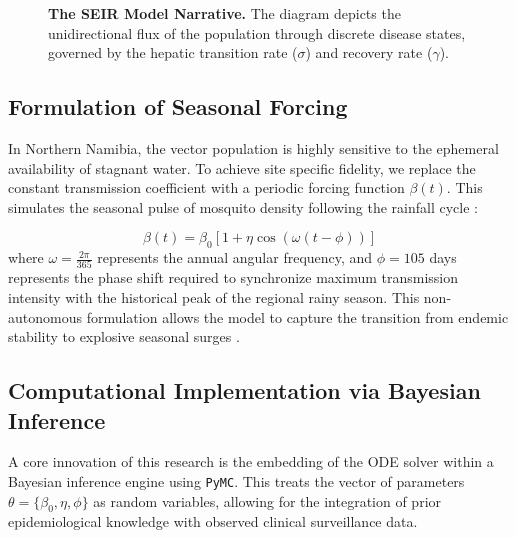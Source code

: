 \documentclass[12pt,a4paper]{report} %
\begin{document}
\begin{figure}[H]
\centering{}
\caption*{\textbf{The SEIR Model Narrative.} The diagram depicts the unidirectional flux of the population through discrete disease states, governed by the hepatic transition rate ($\sigma$) and recovery rate ($\gamma$).}
\end{figure}

\subsection{Formulation of Seasonal Forcing}
In Northern Namibia, the vector population is highly sensitive to the ephemeral availability of stagnant water. To achieve site specific fidelity, we replace the constant transmission coefficient with a periodic forcing function $\beta(t)$. This simulates the seasonal pulse of mosquito density following the rainfall cycle \cite{6, 9}:

\begin{equation}
\beta(t) = \beta_0 \left[ 1 + \eta \cos\left( \omega(t - \phi) \right) \right] 
\end{equation}
where $\omega = \frac{2\pi}{365}$ represents the annual angular frequency, and $\phi = 105$ days represents the phase shift required to synchronize maximum transmission intensity with the historical peak of the regional rainy season. This non-autonomous formulation allows the model to capture the transition from endemic stability to explosive seasonal surges \cite{3, 8}.

\subsection{Computational Implementation via Bayesian Inference}
A core innovation of this research is the embedding of the ODE solver within a Bayesian inference engine using \texttt{PyMC}. This treats the vector of parameters $\theta = \{\beta_0, \eta, \phi\}$ as random variables, allowing for the integration of prior epidemiological knowledge with observed clinical surveillance data.
\end{document}
